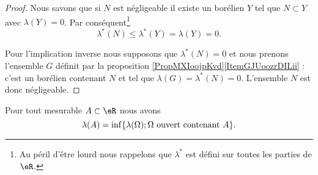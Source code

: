\begin{proof}
    Nous savons que si \( N\) est négligeable il existe un borélien \( Y\) tel que \( N\subset Y\) avec \( \lambda(Y)=0\). Par conséquent\footnote{Au péril d'être lourd nous rappelons que \( \lambda^*\) est défini sur toutes les parties de \( \eR\).}
    \begin{equation}
        \lambda^*(N)\leq \lambda^*(Y)=\lambda(Y)=0.
    \end{equation}
    
    Pour l'implication inverse nous supposons que \( \lambda^*(N)=0\) et nous prenons l'ensemble \( G\) définit par la proposition \ref{PropMXIoojpKvd}\ref{ItemGJUoozrDILii} : c'est un borélien contenant \( N\) et tel que \( \lambda(G)=\lambda^*(N)=0\). L'ensemble \( N\) est donc négligeable.
\end{proof}

\begin{theorem} \label{ThoHFXooONFRN}
    Pour tout mesurable \( A\subset \eR\) nous avons
    \begin{equation}
        \lambda(A)=\inf\{ \lambda(\Omega);\text{\( \Omega\) ouvert contenant \( A\)} \}.
    \end{equation}
\end{theorem}

